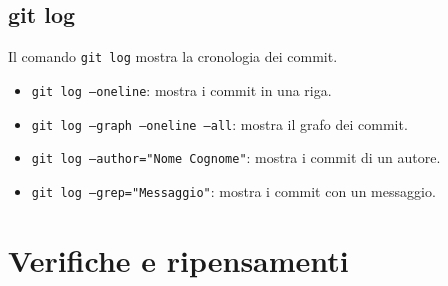 \documentclass{article}
\begin{document}
\pagebreak
\subsection{git log}
Il comando \texttt{git log} mostra la cronologia dei commit.

\begin{itemize}
    \item \texttt{git log --oneline}: mostra i commit in una riga.
    \item \texttt{git log --graph --oneline --all}: mostra il grafo dei commit.
    \item \texttt{git log --author="Nome Cognome"}: mostra i commit di un autore.
    \item \texttt{git log --grep="Messaggio"}: mostra i commit con un messaggio.
\end{itemize}

\section{Verifiche e ripensamenti}
\end{document}

